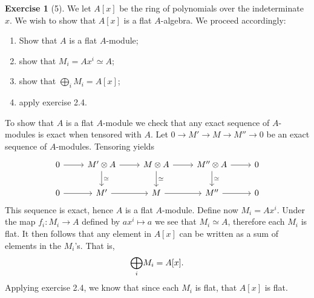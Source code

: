 \documentclass{article}
\theoremstyle{definition}
\newtheorem*{exercise}{Exercise}
\begin{document}
\begin{exercise}[5]
    We let $A[x]$ be the ring of polynomials over the indeterminate $x$. We
    wish to show that $A[x]$ is a flat $A$-algebra. We proceed accordingly:
    \begin{enumerate}
        \item Show that $A$ is a flat $A$-module;
        \item show that $M_i = Ax^i \simeq A$;
        \item show that $\bigoplus_i M_i = A[x]$;
        \item apply exercise 2.4.
    \end{enumerate}
    
    To show that $A$ is a flat $A$-module we check that any exact sequence of
    $A$-modules is exact when tensored with $A$. Let $0 \to M' \to M \to M''
    \to 0$ be an exact sequence of $A$-modules. Tensoring yields
    \[
    \begin{tikzcd}
        0 \arrow[r] & M'\otimes A \arrow[r]\arrow[d, "\simeq"] &
        M\otimes A \arrow[r]\arrow[d, "\simeq"] & M''\otimes A \arrow[r] \arrow[d, "\simeq"] & 0 \\
        0 \arrow[r] & M' \arrow[r] & M \arrow[r] & M'' \arrow[r] & 0
    \end{tikzcd}
    \]
    This sequence is exact, hence $A$ is a flat $A$-module.  Define now $M_i =
    Ax^i$. Under the map $f_i : M_i \to A$ defined by $ax^i \mapsto a$ we see
    that $M_i \simeq A$, therefore each $M_i$ is flat. It then follows that any
    element in $A[x]$ can be written as a sum of elements in the $M_i$'s. That
    is,
    \begin{equation}
        \notag
        \underset{i}{\bigoplus}M_i = A[x].
    \end{equation}
    Applying exercise 2.4, we know that since each $M_i$ is flat, that $A[x]$
    is flat. 
\end{exercise}
\end{document}
